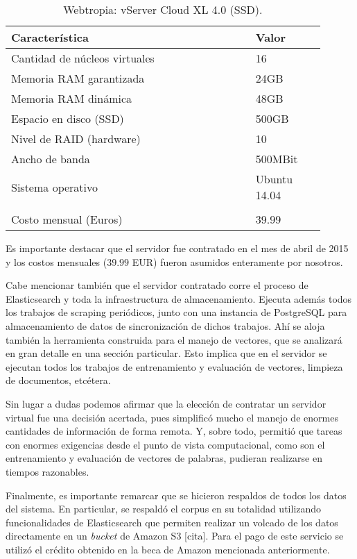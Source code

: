 \begin{table*}[t]
    \centering
    \begin{tabular}{p{0.70\linewidth}p{0.20\linewidth}}
        \hline
        Característica & Valor\\
        \hline
        Cantidad de núcleos virtuales & 16\\
        Memoria RAM garantizada & 24GB\\
        Memoria RAM dinámica & 48GB\\
        Espacio en disco (SSD) & 500GB\\
        Nivel de RAID (hardware) & 10\\
        Ancho de banda & 500MBit\\
        Sistema operativo & Ubuntu 14.04\\
        \\
        Costo mensual (Euros) & 39.99\\
        \hline
    \end{tabular}
    \caption{Webtropia: vServer Cloud XL 4.0 (SSD).}
    \label{table:webtropia}
\end{table*}

Es importante destacar que el servidor fue contratado en el mes de abril de 2015 y los costos mensuales
($39.99$ EUR) fueron asumidos enteramente por nosotros.

Cabe mencionar también que el servidor contratado corre el proceso de Elasticsearch y toda la
infraestructura de almacenamiento. Ejecuta además todos los trabajos de scraping periódicos, junto con
una instancia de PostgreSQL para almacenamiento de datos de sincronización de dichos trabajos. Ahí se
aloja también la herramienta construida para el manejo de vectores, que se analizará en gran detalle en
una sección particular. Esto implica que en el servidor se ejecutan todos los trabajos de entrenamiento y
evaluación de vectores, limpieza de documentos, etcétera.

Sin lugar a dudas podemos afirmar que la elección de contratar un servidor virtual fue una decisión
acertada, pues simplificó mucho el manejo de enormes cantidades de información de forma remota. Y, sobre
todo, permitió que tareas con enormes exigencias desde el punto de vista computacional, como son el
entrenamiento y evaluación de vectores de palabras, pudieran realizarse en tiempos razonables.

Finalmente, es importante remarcar que se hicieron respaldos de todos los datos del sistema. En particular,
se respaldó el corpus en su totalidad utilizando funcionalidades de Elasticsearch que permiten realizar
un volcado de los datos directamente en un \textit{bucket} de Amazon S3 [cita]. Para el pago de este
servicio se utilizó el crédito obtenido en la beca de Amazon mencionada anteriormente.

